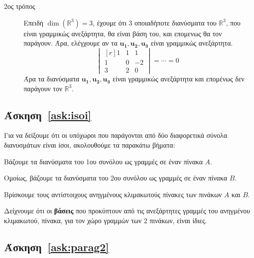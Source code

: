 \begin{description}
  \item[2ος τρόπος] 
    Επειδή $ \dim(\mathbb{R}^{3}) = 3 $, έχουμε ότι 3 οποιαδήποτε διανύσματα του $
    \mathbb{R}^{3} $, που είναι γραμμικώς ανεξάρτητα, θα είναι βάση του, και επομενως
    θα τον παράγουν. Άρα, ελέγχουμε αν τα 
    $ \mathbf{u_{1}}, \mathbf{u_{2}}, \mathbf{u_{3}} $ είναι γραμμικώς ανεξάρτητα.
    \[
      \begin{vmatrix*}[r]
        1 & 1 & 1 \\
        1 & 0 & -2 \\
        3 & 2 & 0 
      \end{vmatrix*} = \cdots = 0
    \] 
    Άρα τα διανύσματα $ \mathbf{u_{1}}, \mathbf{u_{2}}, \mathbf{u_{3}}$ είναι 
    γραμμικώς ανεξάρτητα και επομένως δεν παράγουν τον $ \mathbb{R}^{3}$.
\end{description}



\subsection*{Άσκηση~\ref{ask:isoi}}

Για να δείξουμε ότι οι υπόχωροι που παράγονται από δύο διαφορετικά σύνολα διανυσμάτων
είναι ίσοι, ακολουθούμε τα παρακάτω βήματα:
\begin{myitemize}
  \item Βάζουμε τα διανύσματα του 1ου συνόλου ως \textcolor{Col1}{γραμμές} σε έναν 
    πίνακα $A$.
  \item Ομοίως, βάζουμε τα διανύσματα του 2ου συνόλου ως \textcolor{Col1}{γραμμές} 
    σε έναν πίνακα $Β$.
  \item Βρίσκουμε τους αντίστοιχους \textcolor{Col1}{ανηγμένους κλιμακωτούς} πίνακες 
    των πινάκων $A$ και $B$.
  \item Δείχνουμε ότι οι \textbf{βάσεις} που προκύπτουν από τις ανεξάρτητες γραμμές του 
    \textcolor{Col1}{ανηγμένου κλιμακωτού}, πίνακα, για τον χώρο γραμμών των 2 πινάκων, 
    είναι \textcolor{Col1}{ίδιες}.
\end{myitemize}

\subsection*{Άσκηση~\ref{ask:parag2}}

